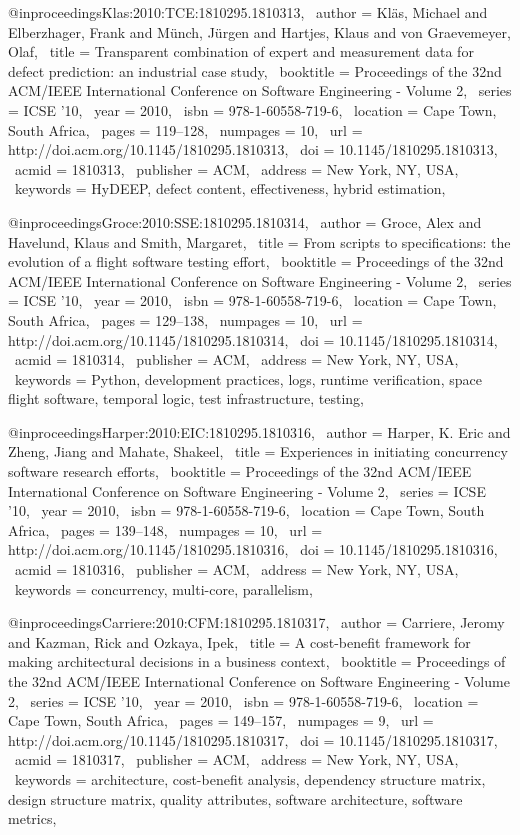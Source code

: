 @inproceedings{Klas:2010:TCE:1810295.1810313,
 author = {Kl\"{a}s, Michael and Elberzhager, Frank and M\"{u}nch, J\"{u}rgen and Hartjes, Klaus and von Graevemeyer, Olaf},
 title = {Transparent combination of expert and measurement data for defect prediction: an industrial case study},
 booktitle = {Proceedings of the 32nd ACM/IEEE International Conference on Software Engineering - Volume 2},
 series = {ICSE '10},
 year = {2010},
 isbn = {978-1-60558-719-6},
 location = {Cape Town, South Africa},
 pages = {119--128},
 numpages = {10},
 url = {http://doi.acm.org/10.1145/1810295.1810313},
 doi = {10.1145/1810295.1810313},
 acmid = {1810313},
 publisher = {ACM},
 address = {New York, NY, USA},
 keywords = {HyDEEP, defect content, effectiveness, hybrid estimation},
} 

@inproceedings{Groce:2010:SSE:1810295.1810314,
 author = {Groce, Alex and Havelund, Klaus and Smith, Margaret},
 title = {From scripts to specifications: the evolution of a flight software testing effort},
 booktitle = {Proceedings of the 32nd ACM/IEEE International Conference on Software Engineering - Volume 2},
 series = {ICSE '10},
 year = {2010},
 isbn = {978-1-60558-719-6},
 location = {Cape Town, South Africa},
 pages = {129--138},
 numpages = {10},
 url = {http://doi.acm.org/10.1145/1810295.1810314},
 doi = {10.1145/1810295.1810314},
 acmid = {1810314},
 publisher = {ACM},
 address = {New York, NY, USA},
 keywords = {Python, development practices, logs, runtime verification, space flight software, temporal logic, test infrastructure, testing},
} 

@inproceedings{Harper:2010:EIC:1810295.1810316,
 author = {Harper, K. Eric and Zheng, Jiang and Mahate, Shakeel},
 title = {Experiences in initiating concurrency software research efforts},
 booktitle = {Proceedings of the 32nd ACM/IEEE International Conference on Software Engineering - Volume 2},
 series = {ICSE '10},
 year = {2010},
 isbn = {978-1-60558-719-6},
 location = {Cape Town, South Africa},
 pages = {139--148},
 numpages = {10},
 url = {http://doi.acm.org/10.1145/1810295.1810316},
 doi = {10.1145/1810295.1810316},
 acmid = {1810316},
 publisher = {ACM},
 address = {New York, NY, USA},
 keywords = {concurrency, multi-core, parallelism},
} 

@inproceedings{Carriere:2010:CFM:1810295.1810317,
 author = {Carriere, Jeromy and Kazman, Rick and Ozkaya, Ipek},
 title = {A cost-benefit framework for making architectural decisions in a business context},
 booktitle = {Proceedings of the 32nd ACM/IEEE International Conference on Software Engineering - Volume 2},
 series = {ICSE '10},
 year = {2010},
 isbn = {978-1-60558-719-6},
 location = {Cape Town, South Africa},
 pages = {149--157},
 numpages = {9},
 url = {http://doi.acm.org/10.1145/1810295.1810317},
 doi = {10.1145/1810295.1810317},
 acmid = {1810317},
 publisher = {ACM},
 address = {New York, NY, USA},
 keywords = {architecture, cost-benefit analysis, dependency structure matrix, design structure matrix, quality attributes, software architecture, software metrics},
} 

